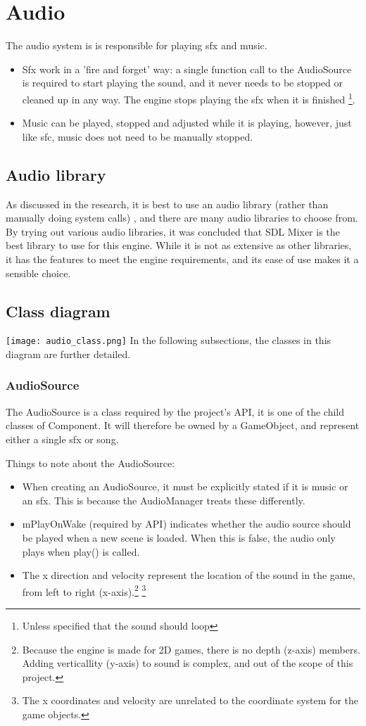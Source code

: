 \documentclass[draft]{article}
\begin{document}
\section{Audio}
The audio system is is responsible for playing sfx and music.
\begin{itemize}
  \item Sfx work in a 'fire and forget' way: a single function call to the AudioSource is required to start playing the sound, and it never needs to be stopped or cleaned up in any way. The engine stops playing the sfx when it is finished \footnote{Unless specified that the sound should loop}.
  \item Music can be played, stopped and adjusted while it is playing, however, just like sfc, music does not need to be manually stopped.
\end{itemize}

\subsection{Audio library}
As discussed in the research, it is best to use an audio library (rather than manually doing system calls)
, and there are many audio libraries to choose from. By trying out various audio libraries, it was concluded that
SDL Mixer is the best library to use for this engine. While it is not as extensive as other libraries,
it has the features to meet the engine requirements, and its ease of use makes it a sensible choice.

\subsection{Class diagram}
\texttt{[image: audio\_class.png]}
In the following subsections, the classes in this diagram are further detailed.
\subsubsection{AudioSource}
The AudioSource is a class required by the project's API, it is one of the child classes of Component.
It will therefore be owned by a GameObject, and represent either a single sfx or song.

Things to note about the AudioSource:
\begin{itemize}
  \item When creating an AudioSource, it must be explicitly stated if it is music or an sfx. This is because the AudioManager treats these differently.
  \item mPlayOnWake (required by API) indicates whether the audio source should be played when a new scene is loaded. When this is false, the audio only plays when play() is called.
  \item The x direction and velocity represent the location of the sound in the game, from left to right (x-axis).\footnote{Because the engine is made for 2D games, there is no depth (z-axis) members. Adding verticallity (y-axis) to sound is complex, and out of the scope of this project.} \footnote{The x coordinates and velocity are unrelated to the coordinate system for the game objects.}
\end{itemize}
\end{document}
